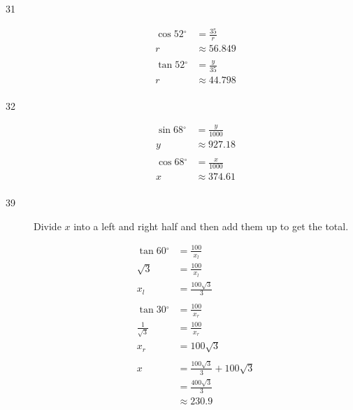 \documentclass{exam}
\newcommand{\dg}{\ensuremath{^\circ}}
\begin{document}
\begin{description}
      \item[31]
        \begin{align*}
          \cos 52 \dg & = \frac{35}{r} \\
          r           & \approx \boxed{ 56.849 } \\
          \\
          \tan 52 \dg & = \frac{y}{35} \\
          r           & \approx \boxed{ 44.798 } \\
        \end{align*}

      \item[32]
        \begin{align*}
          \sin 68 \dg & = \frac{y}{1000} \\
          y           & \approx \boxed{ 927.18 } \\
          \\
          \cos 68 \dg & = \frac{x}{1000} \\
          x           & \approx \boxed{ 374.61 } \\
        \end{align*}

      \item[39]
        Divide $x$ into a left and right half and then add them up to get the total.

        \begin{align*}
          \tan 60 \dg & = \frac{100}{x_l} \\
          \sqrt{3}    & = \frac{100}{x_l} \\
          x_l         & = \frac{100 \sqrt{3}}{3} \\
          \\
          \tan 30 \dg        & = \frac{100}{x_r} \\
          \frac{1}{\sqrt{3}} & = \frac{100}{x_r} \\
          x_r                & = 100 \sqrt{3} \\
          \\
          x & = \frac{100 \sqrt{3}}{3} + 100 \sqrt{3} \\
            & = \frac{400 \sqrt{3}}{3} \\
            & \approx \boxed{ 230.9 }
        \end{align*}


\end{description}
\end{document}
